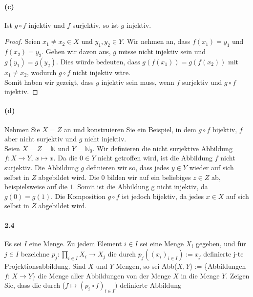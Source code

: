 \documentclass[12pt, letterpaper]{article}
\begin{document}
\paragraph{(c)} Ist $g \circ f$ injektiv und $f$ surjektiv, so ist $g$ injektiv.\\

\begin{proof}

\noindent Seien $x_1 \neq x_2 \in X$ und $y_1, y_2 \in Y$. Wir nehmen an, dass $f(x_1) = y_1$ und $f(x_2) = y_2$. Gehen wir davon aus, $g$ müsse nicht injektiv sein und $g(y_1) = g(y_2)$.
Dies würde bedeuten, dass $g(f(x_1)) = g(f(x_2))$ mit $x_1 \neq x_2$, wodurch $g \circ f$ nicht injektiv wäre.\\

\noindent Somit haben wir gezeigt, dass $g$ injektiv sein muss, wenn $f$ surjektiv und $g \circ f$ injektiv.

\end{proof}

\paragraph{(d)} Nehmen Sie $X = Z$ an und konstruieren Sie ein Beispiel, in dem $g \circ f$ bijektiv, $f$ aber nicht surjektiv und $g$ nicht injektiv.\\

\noindent Seien $X = Z = \mathbb{N}$ und $Y = \mathbb{N}_0$. Wir definieren die nicht surjektive Abbildung $f: X \to Y$, $x \mapsto x$. Da die $0 \in Y$ nicht getroffen wird, ist die Abbildung $f$ nicht surjektiv. Die Abbildung $g$ definieren wir so, dass jedes $y \in Y$ wieder auf sich selbst in $Z$ abgebildet wird. Die $0$ bilden wir auf ein beliebiges $z \in Z$ ab, beispielsweise auf die $1$. Somit ist die Abbildung g nicht injektiv, da $g(0) = g(1)$. Die Komposition $g \circ f$ ist jedoch bijektiv, da jedes $x \in X$ auf sich selbst in $Z$ abgebildet wird. \\

\paragraph{2.4}

\noindent Es sei $I$ eine Menge. Zu jedem Element $i \in I$ sei eine Menge $X_i$ gegeben, und für $j \in I$ bezeichne $p_j: \prod_{i \in I}X_i \to X_j$ die durch $p_j((x_i)_{i \in I}) := x_j$ definierte j-te Projektionsabbildung.
Sind $X$ und $Y$ Mengen, so sei Abb($X, Y$) := \{Abbildungen $f$: $X \to Y$\} die Menge aller Abbildungen von der Menge $X$ in die Menge $Y$. Zeigen Sie, dass die durch ($f \mapsto (p_i \circ f)_{i \in I})$ definierte Abbildung
\end{document}
